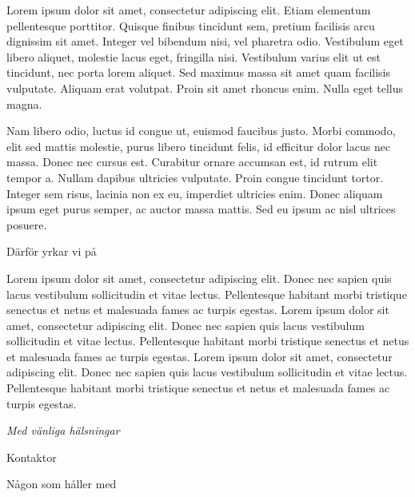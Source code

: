 \documentclass[../main/handlingar.tex]{subfiles}
\begin{document}

Lorem ipsum dolor sit amet, consectetur adipiscing elit. Etiam elementum pellentesque porttitor. Quisque finibus tincidunt sem, pretium facilisis arcu dignissim sit amet. Integer vel bibendum nisi, vel pharetra odio. Vestibulum eget libero aliquet, molestie lacus eget, fringilla nisi. Vestibulum varius elit ut est tincidunt, nec porta lorem aliquet. Sed maximus massa sit amet quam facilisis vulputate. Aliquam erat volutpat. Proin sit amet rhoncus enim. Nulla eget tellus magna.

Nam libero odio, luctus id congue ut, euismod faucibus justo. Morbi commodo, elit sed mattis molestie, purus libero tincidunt felis, id efficitur dolor lacus nec massa. Donec nec cursus est. Curabitur ornare accumsan est, id rutrum elit tempor a. Nullam dapibus ultricies vulputate. Proin congue tincidunt tortor. Integer sem risus, lacinia non ex eu, imperdiet ultricies enim. Donec aliquam ipsum eget purus semper, ac auctor massa mattis. Sed eu ipsum ac nisl ultrices posuere.

Därför yrkar vi på
\begin{attsatser}
    \att Lorem ipsum dolor sit amet, consectetur adipiscing elit. Donec nec sapien quis lacus vestibulum sollicitudin et vitae lectus. Pellentesque habitant morbi tristique senectus et netus et malesuada fames ac turpis egestas.
    \att Lorem ipsum dolor sit amet, consectetur adipiscing elit. Donec nec sapien quis lacus vestibulum sollicitudin et vitae lectus. Pellentesque habitant morbi tristique senectus et netus et malesuada fames ac turpis egestas.
    \att Lorem ipsum dolor sit amet, consectetur adipiscing elit. Donec nec sapien quis lacus vestibulum sollicitudin et vitae lectus. Pellentesque habitant morbi tristique senectus et netus et malesuada fames ac turpis egestas.
\end{attsatser}

\begin{signatures}{2}
    \emph{Med vänliga hälsningar}
    \signature{Erik Månsson}{Kontaktor}
    \signature{Måns Eriksson}{Någon som håller med}
\end{signatures}
\end{document}
